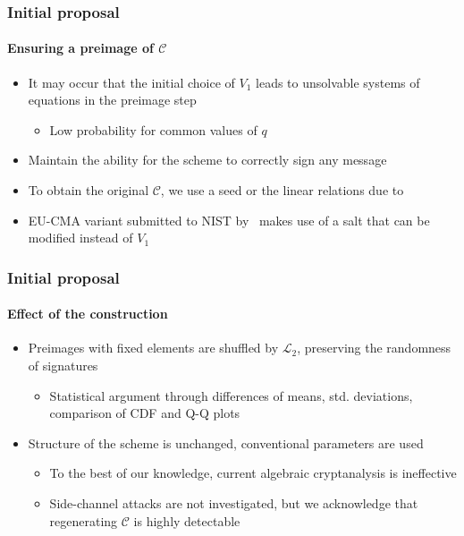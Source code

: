 \documentclass[12pt]{beamer}
\begin{document}
\begin{frame}
  \frametitle{Initial proposal}
  \framesubtitle{Ensuring a preimage of $\mathcal{C}$}
  \begin{itemize}
    \item It may occur that the initial choice of $V_{1}$ leads to unsolvable
        systems of equations in the preimage step
    \begin{itemize}
      \item Low probability for common values of $q$
    \end{itemize}
    \item Maintain the ability for the scheme to correctly sign any message
    \item To obtain the original $\mathcal{C}$, we use a seed or the linear
        relations due to~\cite{Petzoldt:201012}
    \item EU-CMA variant submitted to NIST by~\cite{Ding:201901} makes
        use of a salt that can be modified instead of $V_{1}$
  \end{itemize}
\end{frame}

\begin{frame}
  \frametitle{Initial proposal}
  \framesubtitle{Effect of the construction}
  \begin{itemize}
    \item Preimages with fixed elements are shuffled by $\mathcal{L}_{2}$,
        preserving the randomness of signatures
    \begin{itemize}
      \item Statistical argument through differences of means, std.
          deviations, comparison of CDF and Q-Q plots
    \end{itemize}
    \item Structure of the scheme is unchanged, conventional parameters are
        used
    \begin{itemize}[itemsep=1pt]
      \item To the best of our knowledge, current algebraic cryptanalysis is
          ineffective
      \item Side-channel attacks are not investigated, but we acknowledge that
          regenerating $\mathcal{C}$ is highly detectable
    \end{itemize}
  \end{itemize}
\end{frame}
\end{document}
